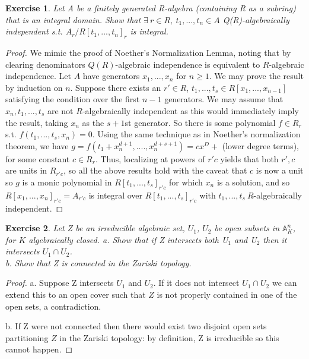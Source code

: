 \documentclass{article}
\newcommand{\bb}[1]{\mathbb{#1}}
\newtheorem{exercise}{Exercise}
\begin{document}
\begin{exercise}
  Let A be a finitely generated R-algebra (containing R as a subring) that is an integral domain. Show that $\exists \ r\in R, \ t_{1},...,t_{n} \in A$ Q(R)-algebraically independent s.t. $A_{r}/R[t_{1},...,t_{n}]_{r}$ is integral.  
\end{exercise}
\begin{proof}
  We mimic the proof of Noether's Normalization Lemma, noting that by clearing denominators $Q(R)$-algebraic independence is equivalent to $R$-algebraic independence. Let $A$ have generators $x_{1},...,x_{n}$ for $n \geq 1$. We may prove the result by induction on $n$. Suppose there exists an $r'\in R$, $t_{1},...,t_{s} \in R[x_{1},...,x_{n-1}]$ satisfying the condition over the first $n-1$ generators. We may assume that $x_{n},t_{1},...,t_{s}$ are not $R$-algebraically independent as this would immediately imply the result, taking $x_{n}$ as the $s+1$st generator. So there is some polynomial $f \in R_{r}$ s.t. $f(t_{1},...,t_{s},x_{n}) = 0$. Using the same technique as in Noether's normalization theorem, we have $g = f(t_{1}+ x_{n}^{d+1}, ....,x_{n}^{d+s+1}) = cx^{D} +$ (lower degree terms), for some constant $c \in R_{r}$. Thus, localizing at powers of $r'c$ yields that both $r', c$ are units in $R_{r'c}$, so all the above results hold with the caveat that $c$ is now a unit so $g$ is a monic polynomial in $R[t_{1},...,t_{s}]_{r'c}$ for which $x_{n}$ is a solution, and so $R[x_{1},...,x_{n}]_{r'c} = A_{r'c}$ is integral over $R[t_{1},...,t_{s}]_{r'c}$ with $t_{1},...,t_{s} \ R$-algebraically independent.  
\end{proof}
\begin{exercise}
  Let Z be an irreducible algebraic set, $U_{1}$, $U_{2}$ be open subsets in $\bb{A}^{n}_{K}$, for $K$ algebraically closed.
  a. Show that if Z intersects both U$_{1}$ and U$_{2}$ then it intersects $U_{1}\cap U_{2}$. \\
  b. Show that Z is connected in the Zariski topology.
\end{exercise}
\begin{proof}
  a. Suppose Z intersects $U_{1}$ and $U_{2}$. If it does not intersect $U_{1}\cap U_{2}$ we can extend this to an open cover such that $Z$ is not properly contained in one of the open sets, a contradiction. 
  
  b. If Z were not connected then there would exist two disjoint open sets partitioning $Z$ in the Zariski topology: by definition, Z is irreducible so this cannot happen. 
\end{proof}
\end{document}
